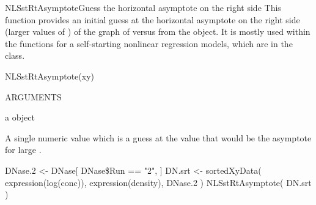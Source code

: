 \documentclass[pdftex]{article} \usepackage{url,graphicx}
\begin{document}
\begin{Helpfile}{NLSstRtAsymptote}{Guess the horizontal asymptote on the right side}
This function provides an initial guess at the horizontal asymptote on
the right side (larger values of ) of the graph of 
versus  from the  object.  It is mostly used within the
 functions for a self-starting nonlinear regression
models, which are in the  class.
\begin{Example}
NLSstRtAsymptote(xy)
\end{Example}
\begin{Argument}{ARGUMENTS}
\item[\Co{xy:}]
a  object
\end{Argument}
A single numeric value which is a guess at the  value that
would be the asymptote for large .
\need 15pt
\vspace{-16pt}
\begin{Example}
DNase.2 <- DNase[ DNase\$Run == "2", ]
DN.srt <- sortedXyData( expression(log(conc)), expression(density), DNase.2 )
NLSstRtAsymptote( DN.srt )
\end{Example}
\end{Helpfile}
\end{document}

